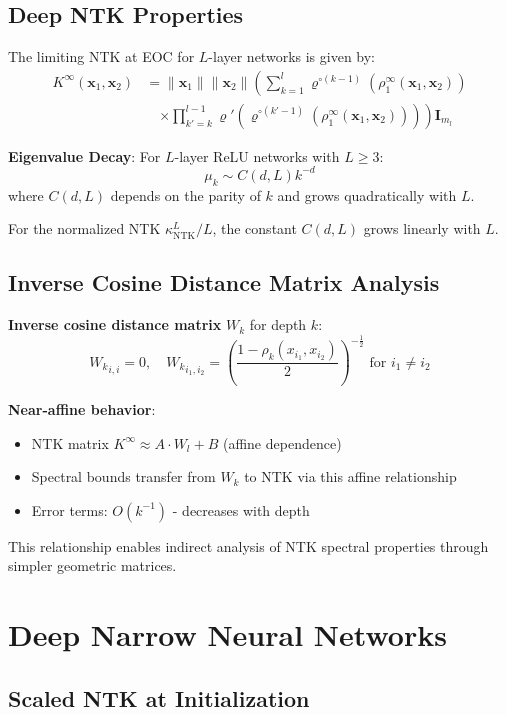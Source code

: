 \documentclass{article}
\begin{document}
\subsection{Deep NTK Properties}

The limiting NTK at EOC for $L$-layer networks is given by:
\begin{align}
K^{\infty}(\mathbf{x}_1, \mathbf{x}_2) &= \|\mathbf{x}_1\| \|\mathbf{x}_2\| \left( \sum_{k=1}^l \varrho^{\circ (k-1)}\left(\rho_1^{\infty}(\mathbf{x}_1, \mathbf{x}_2)\right) \right. \\
&\quad \left. \times \prod_{k'=k}^{l-1} \varrho'\left(\varrho^{\circ (k'-1)}\left(\rho_1^{\infty}(\mathbf{x}_1, \mathbf{x}_2)\right)\right) \right) \mathbf{I}_{m_l}
\end{align}

\textbf{Eigenvalue Decay}: For $L$-layer ReLU networks with $L \geq 3$:
\[ \mu_k \sim C(d, L)k^{-d} \]
where $C(d, L)$ depends on the parity of $k$ and grows quadratically with $L$.

For the normalized NTK $\kappa^L_{\text{NTK}}/L$, the constant $C(d, L)$ grows linearly with $L$.

\subsection{Inverse Cosine Distance Matrix Analysis}

\textbf{Inverse cosine distance matrix} $W_k$ for depth $k$:
\[ {W_k}_{i,i} = 0, \quad {W_k}_{i_1,i_2} = \left( \frac{1 - \rho_k(x_{i_1},x_{i_2})}{2} \right)^{-\frac{1}{2}} \text{ for } i_1 \neq i_2 \]

\textbf{Near-affine behavior}:
\begin{itemize}
\item NTK matrix $K^{\infty} \approx A \cdot W_l + B$ (affine dependence)
\item Spectral bounds transfer from $W_k$ to NTK via this affine relationship  
\item Error terms: $O(k^{-1})$ - decreases with depth
\end{itemize}

This relationship enables indirect analysis of NTK spectral properties through simpler geometric matrices.

\section{Deep Narrow Neural Networks}

\subsection{Scaled NTK at Initialization}
\end{document}
